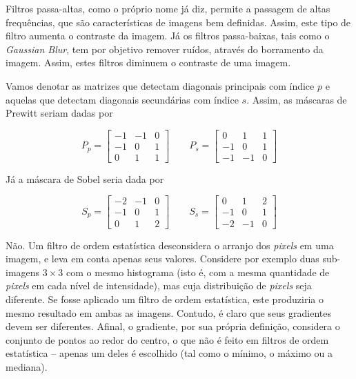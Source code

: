 \documentclass[10pt,a4paper]{article}
\newcommand{\pixels}{\textit{pixels} }
\begin{document}
\begin{enumerate}

Filtros passa-altas, como o próprio nome já diz, permite a passagem de altas frequências, que são características de imagens bem definidas. Assim, este tipo de filtro aumenta o contraste da imagem. Já os filtros passa-baixas, tais como o \textit{Gaussian Blur}, tem por objetivo remover ruídos, através do borramento da imagem. Assim, estes filtros diminuem o contraste de uma imagem.


Vamos denotar as matrizes que detectam diagonais principais com índice $p$ e aquelas que detectam diagonais secundárias com índice $s$. Assim, as máscaras de Prewitt seriam dadas por

\[P_p = \left[\begin{array}{ccc}
  -1 & -1 & 0 \\
  -1 &  0 & 1 \\
  0  &  1 & 1
\end{array}\right]
\qquad
P_s = \left[\begin{array}{ccc}
  0 & 1 & 1 \\
  -1 &  0 & 1 \\
  -1  & -1 & 0
\end{array}\right]
\]

Já a máscara de Sobel seria dada por

\[S_p = \left[\begin{array}{ccc}
  -2 & -1 & 0 \\
  -1 &  0 & 1 \\
  0  &  1 & 2
\end{array}\right]
\qquad
S_s = \left[\begin{array}{ccc}
  0 & 1 & 2 \\
  -1 &  0 & 1 \\
  -2  & -1 & 0
\end{array}\right]
\]

  Não. Um filtro de ordem estatística desconsidera o arranjo dos \pixels em uma imagem, e leva em conta apenas seus valores. Considere por exemplo duas sub-imagens $3\times3$ com o mesmo histograma (isto é, com a mesma quantidade de \pixels em cada nível de intensidade), mas cuja distribuição de \pixels seja diferente. Se fosse aplicado um filtro de ordem estatística, este produziria o mesmo resultado em ambas as imagens. Contudo, é claro que seus gradientes devem ser diferentes. Afinal, o gradiente, por sua própria definição, considera o conjunto de pontos ao redor do centro, o que não é feito em filtros de ordem estatística -- apenas um deles é escolhido (tal como o mínimo, o máximo ou a mediana).
\end{enumerate}
\end{document}
